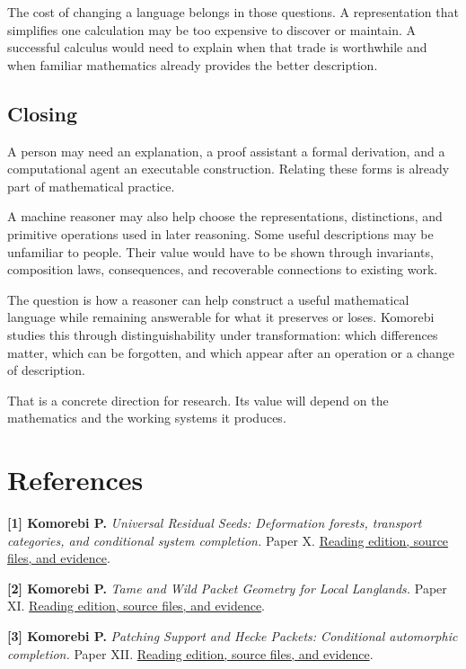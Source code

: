 \documentclass[11pt,oneside,openany]{book}
\begin{document}
The cost of changing a language belongs in those questions. A representation that simplifies one calculation may be too expensive to discover or maintain. A successful calculus would need to explain when that trade is worthwhile and when familiar mathematics already provides the better description.

\section{Closing}
A person may need an explanation, a proof assistant a formal derivation, and a computational agent an executable construction. Relating these forms is already part of mathematical practice.

A machine reasoner may also help choose the representations, distinctions, and primitive operations used in later reasoning. Some useful descriptions may be unfamiliar to people. Their value would have to be shown through invariants, composition laws, consequences, and recoverable connections to existing work.

The question is how a reasoner can help construct a useful mathematical language while remaining answerable for what it preserves or loses. Komorebi studies this through distinguishability under transformation: which differences matter, which can be forgotten, and which appear after an operation or a change of description.

That is a concrete direction for research. Its value will depend on the mathematics and the working systems it produces.

\backmatter
\chapter{References}
\hypertarget{reference-1}{}
\textbf{[1] Komorebi P.} \emph{Universal Residual Seeds: Deformation forests, transport categories, and conditional system completion.} Paper X. \href{https://komorebip.github.io/Operation-KOMOREBI/collection/works/paper-x.html}{Reading edition, source files, and evidence}.

\hypertarget{reference-2}{}
\textbf{[2] Komorebi P.} \emph{Tame and Wild Packet Geometry for Local Langlands.} Paper XI. \href{https://komorebip.github.io/Operation-KOMOREBI/collection/works/paper-xi.html}{Reading edition, source files, and evidence}.

\hypertarget{reference-3}{}
\textbf{[3] Komorebi P.} \emph{Patching Support and Hecke Packets: Conditional automorphic completion.} Paper XII. \href{https://komorebip.github.io/Operation-KOMOREBI/collection/works/paper-xii.html}{Reading edition, source files, and evidence}.
\end{document}
